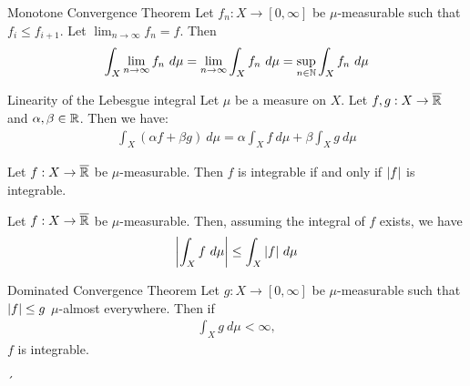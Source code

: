 \begin{importanttheorem}
	{Monotone Convergence Theorem}{}
	Let $f_n : X \to [0,\infty]$ be $\mu$-measurable such that $f_i \leq f_{i+1}$. Let $\lim_{n \to \infty} f_n = f$. Then
	\begin{align*}
		\int_X \lim_{n \to \infty} f_n ~d\mu
		= 	\lim_{n \to \infty} \int_X f_n ~d\mu
		= 	\sup_{n \in \mathbb{N}} \int_X f_n ~d\mu
	\end{align*}
\end{importanttheorem}
\begin{importanttheorem}{Linearity of the Lebesgue integral}{}
	Let $\mu$ be a measure on $X$. Let $f,g : X \to \overline{{\mathbb{R}}}$ and $\alpha, \beta \in \mathbb{R}$. Then we have:
	\begin{align*}
		\int_X (\alpha f + \beta g) ~d\mu = \alpha \int_X f ~d\mu + \beta \int_X g ~d\mu
	\end{align*}
\end{importanttheorem}
\begin{corollary}
	Let $f : X \to \overline{{\mathbb{R}}}$ be $\mu$-measurable. Then $f$ is integrable if and only if $\abs{f}$ is integrable.
\end{corollary}
\begin{corollary}
	Let $f : X \to \overline{{\mathbb{R}}}$ be $\mu$-measurable. Then, assuming the integral of $f$ exists, we have
	\begin{align*}
		\abs{\int_X f ~d\mu} \leq \int_X \abs{f} ~d\mu
	\end{align*}
\end{corollary}
\begin{importantcorollary}
	{Dominated Convergence Theorem}{}
	Let $g : X \to [0,\infty]$ be $\mu$-measurable such that $\abs{f} \leq g$ $\mu$-almost everywhere. Then if
	\begin{align*}
		\int_X g ~d\mu < \infty,
	\end{align*}
	$f$ is integrable.
\end{importantcorollary}´

\clearpage

